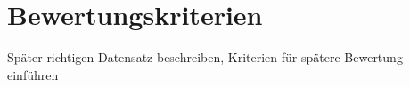 \section{Bewertungskriterien}

Später richtigen Datensatz beschreiben, Kriterien für spätere Bewertung einführen